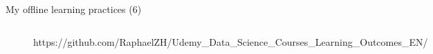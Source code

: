 \documentclass{beamer}
\begin{document}
\begin{frame}[fragile]{My offline learning practices (6)}
\begin{figure}[!htb]
		\endminipage\hfill
		\vspace{.2em}
		\begin{columns}
			\normalfont\footnotesize{https://github.com/RaphaelZH/Udemy\_Data\_Science\_Courses\_Learning\_Outcomes\_EN/}
		\end{columns}
	\end{figure}
\end{frame}

\backmatter
\end{document}
